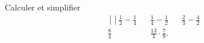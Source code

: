 
\begin{exercice}\label{exoSeconde-0017}

    Calculer et simplifier
    \begin{equation}
        \begin{aligned}[]
            \frac{ 1 }{ 2 }-\frac{1}{ 4 }&&\frac{1}{ 4 }-\frac{ 1 }{2}&&\frac{ 2 }{ 3 }-\frac{ 4 }{ 2 }\\
            \frac{ 8 }{ 4 }&&\frac{ 13 }{ 3 }\cdot \frac{ 7 }{ 9 }.
        \end{aligned}
    \end{equation}

\end{exercice}
